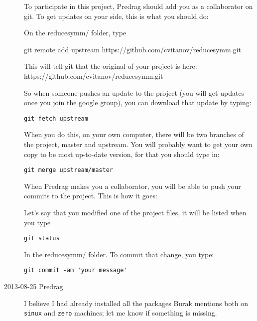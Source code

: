 \begin{description}
To participate in this project, Predrag should add you as a collaborator on git. To get updates on your side, this is what you should do:

On the reducesymm/ folder, type

git remote add upstream https://github.com/cvitanov/reducesymm.git

This will tell git that the original of your project is here: https://github.com/cvitanov/reducesymm.git

So when someone pushes an update to the project (you will get updates once you join the google group), you can download that update by typing:

\begin{verbatim}
git fetch upstream
\end{verbatim}

When you do this, on your own computer, there will  be two branches of the project, master and upstream. You will probably want to get your own copy to be most up-to-date version, for that you should type in:

\begin{verbatim}
git merge upstream/master
\end{verbatim}

When Predrag makes you a collaborator, you will be able to push your commits to the project. This is how it goes:

Let's say that you modified one of the project files, it will be listed when you type

\begin{verbatim}
git status
\end{verbatim}

In the reducesymm/ folder. To commit that change, you type:

\begin{verbatim}
git commit -am 'your message'
\end{verbatim}

\item[2013-08-25 Predrag] I believe I had already installed all the
packages Burak mentions both on \texttt{sinux} and \texttt{zero}
machines; let me know if something is missing.

\end{description}

